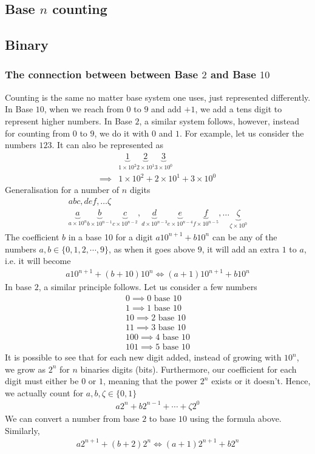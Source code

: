 \documentclass[11pt,a4 paper]{book}
\theoremstyle{plain}
\theoremstyle{definition}
\theoremstyle{remark}
\begin{document}
\begin{flushleft}
\chapter{Base $n$ counting}
\section{Binary}
\subsection{The connection between between Base $2$ and Base $10$}
Counting is the same no matter base system one uses, just represented differently. In Base $10$, when we reach from $0$ to $9$ and add $+1$, we add a tens digit to represent higher numbers. In Base $2$, a similar system follows, however, instead for counting from $0$ to $9$, we do it with $0$ and $1$. For example, let us consider the numbers $123$. It can also be represented as
\begin{align}
&\underbrace{1}_{1 \times 10^2}\underbrace{2}_{2 \times 10^1}\underbrace{3}_{3 \times 10^0}\\
\implies &1\times10^2+2\times10^1+3\times10^0
\end{align}
Generalisation for a number of $n$ digits
\begin{align}
abc,def,\ldots \zeta \\
\underbrace{a}_{a \times 10^n}\underbrace{b}_{b\times 10^{n-1}}\underbrace{c}_{c \times 10^{n-2}},\underbrace{d}_{d \times 10^{n-3}}\underbrace{e}_{e \times 10^{n-4}} \underbrace{f}_{f \times 10^{n-5}},\ldots \underbrace{\zeta}_{\zeta\times 10^0}
\end{align}
The coefficient $b$ in a base 10 for a digit $a10^{n+1}+b10^n$ can be any of the numbers $a,b \in \{0,1,2,\cdots,9\}$, as when it goes above $9$, it will add an extra $1$ to $a$, i.e. it will become 
\begin{align}
a10^{n+1}+(b+10)10^n \iff (a+1)10^{n+1}+b10^n
\end{align}
In base $2$, a similar principle follows. Let us consider a few numbers
\begin{align}
0 \implies 0 \text{ base } 10\\
1 \implies 1 \text{ base } 10\\
10 \implies 2 \text { base } 10 \\
11 \implies 3 \text { base } 10 \\
100 \implies 4 \text { base } 10 \\
101 \implies 5 \text { base } 10
\end{align}
It is possible to see that for each new digit added, instead of growing with $10^n$, we grow as $2^n$ for $n$ binaries digits (bits). Furthermore, our coefficient for each digit must either be $0$ or $1$, meaning that the power $2^n$ exists or it doesn't. Hence, we actually count for $a,b,\zeta \in \{0,1\}$
\begin{align}
a2^n+b2^{n-1}+\cdots+\zeta 2^0
\end{align}
We can convert a number from base $2$ to base $10$ using the formula above. Similarly,
\begin{align}
a2^{n+1}+(b+2)2^n \iff (a+1)2^{n+1}+b2^n
\end{align}

\end{flushleft}
\end{document}
